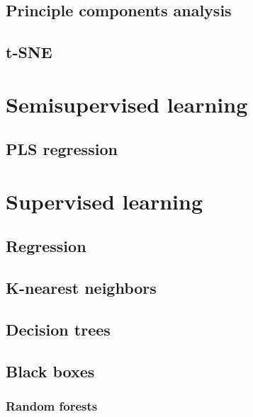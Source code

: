 \documentclass[
]{book}
\begin{document}
\hypertarget{principle-components-analysis}{%
\subsection{Principle components analysis}\label{principle-components-analysis}}

\hypertarget{t-sne}{%
\subsection{t-SNE}\label{t-sne}}

\hypertarget{semisupervised-learning}{%
\section{Semisupervised learning}\label{semisupervised-learning}}

\hypertarget{pls-regression}{%
\subsection{PLS regression}\label{pls-regression}}

\hypertarget{supervised-learning}{%
\section{Supervised learning}\label{supervised-learning}}

\hypertarget{regression}{%
\subsection{Regression}\label{regression}}

\hypertarget{k-nearest-neighbors}{%
\subsection{K-nearest neighbors}\label{k-nearest-neighbors}}

\hypertarget{decision-trees}{%
\subsection{Decision trees}\label{decision-trees}}

\hypertarget{black-boxes}{%
\subsection{Black boxes}\label{black-boxes}}

\hypertarget{random-forests}{%
\subsubsection{Random forests}\label{random-forests}}
\end{document}

